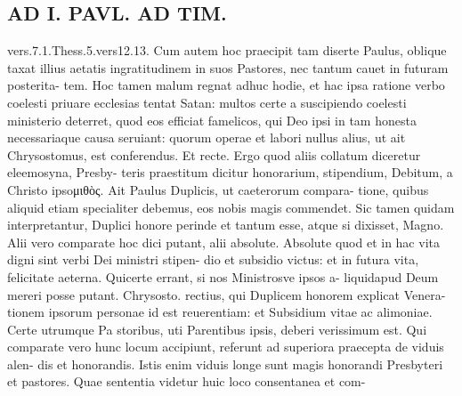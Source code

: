 \documentclass{article}
\begin{document}
\begin{pages}
\section*{AD I. PAVL. AD TIM. }
\marginpar{[ p.306 ]}vers.7.1.Thess.5.vers12.13. Cum autem hoc praecipit tam diserte Paulus, oblique taxat illius aetatis ingratitudinem in suos Pastores, nec tantum cauet in futuram posterita- tem. Hoc tamen malum regnat adhuc hodie, et hac ipsa ratione verbo coelesti priuare ecclesias tentat Satan: multos certe a suscipiendo coelesti ministerio deterret, quod eos efficiat famelicos, qui Deo ipsi in tam honesta necessariaque causa seruiant: quorum operae et labori nullus alius, ut ait Chrysostomus, est conferendus. Et recte. Ergo quod aliis collatum diceretur eleemosyna, Presby- teris praestitum dicitur honorarium, stipendium, Debitum, a Christo ipsoμιθὸς. Ait Paulus Duplicis, ut caeterorum compara- tione, quibus aliquid etiam specialiter debemus, eos nobis magis commendet. Sic tamen quidam interpretantur, Duplici honore perinde et tantum esse, atque si dixisset, Magno. Alii vero comparate hoc dici putant, alii absolute. Absolute quod et in hac vita digni sint verbi Dei ministri stipen- dio et subsidio victus: et in futura vita, felicitate aeterna. Quicerte errant, si nos Ministrosve ipsos a- liquidapud Deum mereri posse putant. Chrysosto. rectius, qui Duplicem honorem explicat Venera- tionem ipsorum personae id est reuerentiam: et Subsidium vitae ac alimoniae. Certe utrumque Pa storibus, uti Parentibus ipsis, deberi verissimum est. Qui comparate vero hunc locum accipiunt, referunt ad superiora praecepta de viduis alen- dis et honorandis. Istis enim viduis longe sunt magis honorandi Presbyteri et pastores. Quae sententia videtur huic loco consentanea et com- 

\end{pages}
\end{document}
